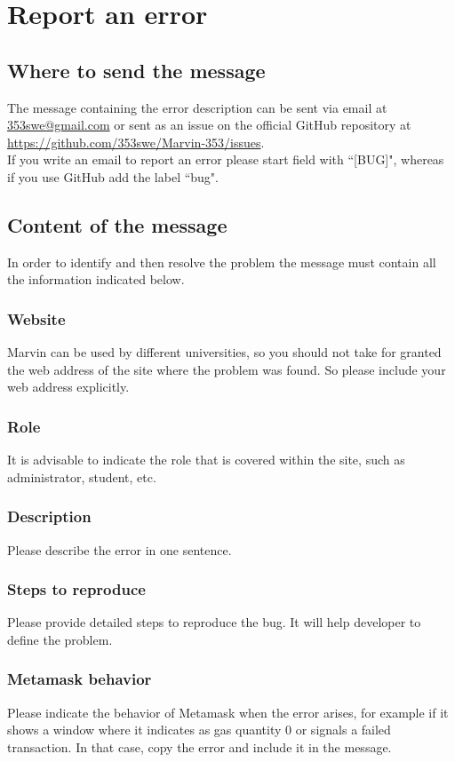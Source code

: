 \documentclass[ManualeUtente]{subfiles}
\begin{document}
\section{Report an error}
\subsection{Where to send the message}
The message containing the error description can be sent via email at \href{mailto: 353swe@gmail.com}{ 353swe@gmail.com} or sent as an issue on the official GitHub repository at \href{https://github.com/353swe/Marvin-353/issues}{https://github.com/353swe/Marvin-353/issues}. \\
If you write an email to report an error please start field with ``[BUG]", whereas if you use GitHub add the label ``bug".

\subsection{Content of the message}
In order to identify and then resolve the problem the message must contain all the information indicated below.

\subsubsection{Website}
Marvin can be used by different universities, so you should not take for granted the web address of the site where the problem was found. So please include your web address explicitly.

\subsubsection{Role}
It is advisable to indicate the role that is covered within the site, such as administrator, student, etc.

\subsubsection{Description}
Please describe the error in one sentence.

\subsubsection{Steps to reproduce}
Please provide detailed steps to reproduce the bug. It will help developer to define the problem.

\subsubsection{Metamask behavior}
Please indicate the behavior of Metamask when the error arises, for example if it shows a window where it indicates as gas quantity 0 or signals a failed transaction. In that case, copy the error and include it in the message.
\end{document}

